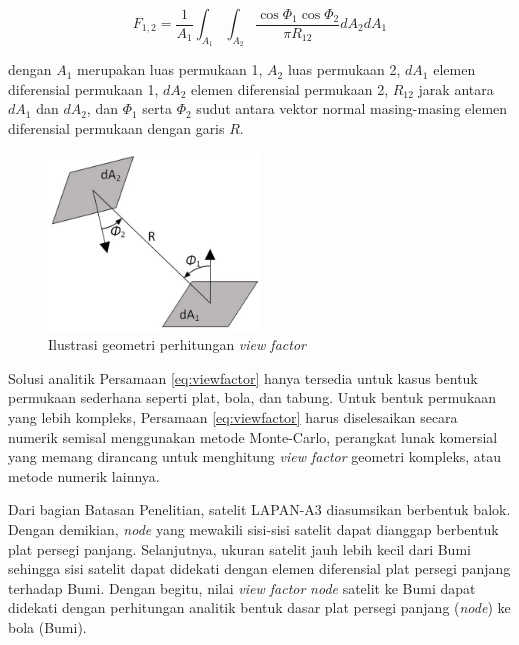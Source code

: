 \begin{equation}
\label{eq:viewfactor}
	F_{1,2} = \frac{1}{A_1} \int_{A_1} \int_{A_2} \frac{\cos{\Phi_1} \cos{\Phi_2}}{\pi R_{12}} dA_2 dA_1
\end{equation}

dengan $A_1$ merupakan luas permukaan 1, $A_2$ luas permukaan 2, $dA_1$ elemen
diferensial permukaan 1, $dA_2$ elemen diferensial permukaan 2, $R_{12}$ jarak
antara $dA_1$ dan $dA_2$, dan $\Phi_1$ serta $\Phi_2$ sudut antara vektor
normal masing-masing elemen diferensial permukaan dengan garis $R$.  

\begin{figure}[!ht]
\setlength{}
\begin{center}
\includegraphics[width=0.5\textwidth]{fig/viewfactor.jpg}
	\caption[Ilustrasi geometri perhitungan \textit{view factor}]{Ilustrasi geometri perhitungan \textit{view factor}~\cite{muneer2020}}
\label{fig:viewfactor}
\end{center}
\end{figure}

Solusi analitik Persamaan \ref{eq:viewfactor} hanya tersedia
untuk kasus bentuk permukaan sederhana seperti plat, bola, dan tabung.
Untuk bentuk permukaan yang lebih kompleks, Persamaan
\ref{eq:viewfactor} harus diselesaikan secara numerik semisal
menggunakan metode Monte-Carlo, perangkat lunak komersial yang memang
dirancang untuk menghitung \textit{view factor} geometri kompleks,
atau metode numerik lainnya.

Dari bagian Batasan Penelitian, satelit LAPAN-A3 diasumsikan berbentuk
balok. Dengan demikian, \textit{node} yang mewakili sisi-sisi
satelit dapat dianggap berbentuk plat persegi panjang. Selanjutnya, ukuran
satelit jauh lebih kecil dari Bumi sehingga sisi satelit dapat didekati dengan
elemen diferensial plat persegi panjang terhadap Bumi. Dengan begitu, nilai
\textit{view factor} \textit{node} satelit ke Bumi dapat didekati
dengan perhitungan analitik bentuk dasar plat persegi panjang
(\textit{node}) ke bola (Bumi). 

